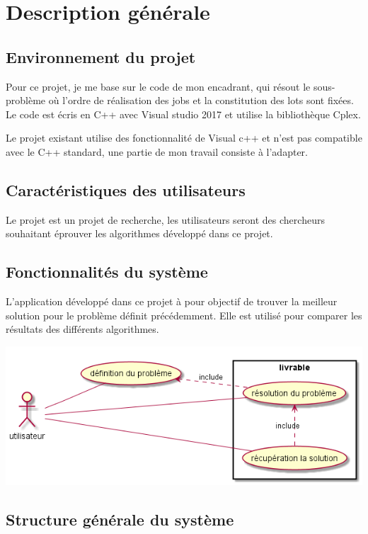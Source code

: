 \chapter{Description générale}

\section{Environnement du projet}
Pour ce projet, je me base sur le code de mon encadrant, qui résout le sous-problème où l'ordre de réalisation des jobs et la constitution des lots sont fixées.
Le code est écris en C++ avec Visual studio 2017 et utilise la bibliothèque Cplex.

Le projet existant utilise des fonctionnalité de Visual c++ et n'est pas compatible avec le C++ standard,
 une partie de mon travail consiste à l'adapter.
\section{Caractéristiques des utilisateurs}
Le projet est un projet de recherche, les utilisateurs seront des chercheurs souhaitant éprouver les algorithmes développé dans ce projet.
 
\section{Fonctionnalités du système}
L'application développé dans ce projet à pour objectif de trouver la meilleur solution pour le problème définit précédemment.
Elle est utilisé pour comparer les résultats des différents algorithmes.

\includegraphics[width=\textwidth]{parts/description_generale/use_cases}
\section{Structure générale du système}